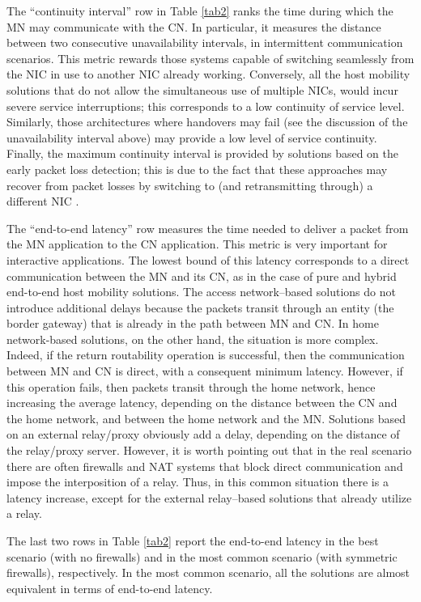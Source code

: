 \documentclass[preprint,12pt]{elsarticle}
\begin{document}
The ``continuity interval'' row in Table \ref{tab2} ranks the time during which 
the MN may communicate with the CN. 
In particular, it measures the distance between two consecutive unavailability 
intervals, in intermittent communication scenarios.  
This metric rewards those systems capable of switching seamlessly from the NIC in use to another NIC already working. 
Conversely, all the host mobility solutions that do not allow the simultaneous use of multiple NICs, would incur severe service interruptions; this corresponds to a low continuity of service level. 
Similarly, those architectures where handovers may fail (see the discussion of the unavailability interval above) may provide a low level of service continuity. 
Finally, the maximum continuity interval is provided by solutions based on the early packet loss detection; this is due to the fact that these approaches may recover from packet losses by switching to (and retransmitting through) a different NIC
\cite{ngmast}. 

The ``end-to-end latency'' row measures the time needed to deliver a packet from the MN 
application to the CN application. This metric is very important for interactive 
applications. 
The lowest bound of this latency corresponds to a direct communication 
between the MN and its CN, as in the case of pure and hybrid end-to-end 
host mobility solutions. 
The access network–based solutions do not introduce additional delays because 
the packets transit through an entity (the border gateway) that is already in 
the path between MN and CN. In home network-based solutions, on the other hand, the 
situation is more complex. Indeed, if the return routability operation is 
successful, then the communication between MN and CN is direct, with a 
consequent minimum latency. However, if this operation fails, then packets 
transit through the home network, hence increasing the average 
latency, depending on the distance between the CN and the home network, and 
between the home network and the MN. 
Solutions based on an external relay/proxy obviously add a delay, depending on 
the distance of the relay/proxy server. However, it is worth pointing out that 
in the real scenario there are often firewalls and NAT systems that block 
direct communication and impose the interposition of a relay. Thus, in this 
common situation there is a latency increase, except for the external 
relay–based solutions that already utilize a relay. 

The last two rows in Table \ref{tab2} report the end-to-end latency in the best 
scenario (with no firewalls) and in the most common scenario (with symmetric 
firewalls), respectively. In the most common scenario, all the solutions are 
almost equivalent in terms of end-to-end latency. 
\end{document}
